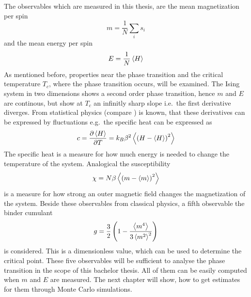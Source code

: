     The observables which are measured in this thesis, are the mean
    magnetization per spin
    \begin{equation}
        m = \frac{1}{N} \sum_i s_i
    \end{equation}
    and the mean energy per spin
    \begin{equation}
        E = \frac{1}{N} \left< H \right>
    \end{equation}
    As mentioned before, properties near the phase transition and the
    critical temperature \(T_c\), where the phase transition occurs, will
    be examined. The Ising system in two dimensions shows a second order
    phase transition, hence \(m\) and \(E\) are continous, but show at
    \(T_c\) an infinitly sharp slope i.e.\ the first derivative diverges.
    From statistical physics (compare \cite{nolting2005}) is known, that
    these derivatives can be expressed by fluctuations e.g.\ the specific
    heat can be expressed as
    \begin{equation}
        c = \frac{\partial \left< H \right>}{\partial T} = k_B \beta^2 \left< \left(H-\left< H \right>\right)^2 \right>
    \end{equation}
    The specific heat is a measure for how much energy is needed to change
    the temperature of the system.
    Analogical the susceptibility
    \begin{equation}
        \chi = N \beta \left< \left(m-\left< m \right>\right)^2 \right>
    \end{equation}
    is a measure for how strong an outer magnetic field changes the
    magnetization of the system.
    Beside these observables from classical physics, a fifth observable
    the binder cumulant \cite{Binder1981}
    \begin{equation}
        g = \frac{3}{2}\left(1-\frac{\left< m^4 \right>}{3\left< m^2 \right>^2}\right)
        \label{eq:binder}
    \end{equation}
    is considered.
    This is a dimensionless value, which can be used to determine the
    critical point. These five observables will be sufficient to analyse
    the phase transition in the scope of this bachelor thesis. All of them
    can be easily computed when \(m\) and \(E\) are measured. The next
    chapter will show, how to get estimates for them through Monte Carlo
    simulations.

